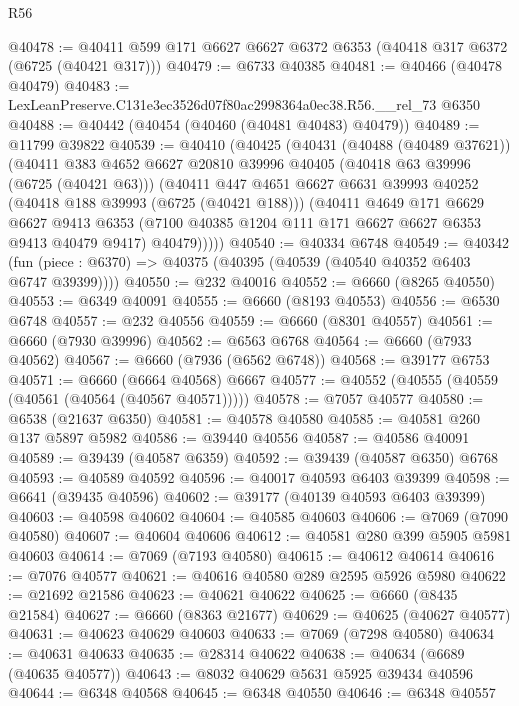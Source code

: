 \begin{lexlean}{R56}
\begin{coremodule}
@40478 := @40411 @599 @171 @6627 @6627 @6372 @6353 (@40418 @317 @6372 (@6725 (@40421 @317)))
@40479 := @6733 @40385
@40481 := @40466 (@40478 @40479)
@40483 := LexLeanPreserve.C131e3ec3526d07f80ac2998364a0ec38.R56.__rel_73 @6350
@40488 := @40442 (@40454 (@40460 (@40481 @40483) @40479))
@40489 := @11799 @39822
@40539 := @40410
    (@40425
      (@40431
        (@40488 (@40489 @37621))
        (@40411
          @383
          @4652
          @6627
          @20810
          @39996
          @40405
          (@40418 @63 @39996 (@6725 (@40421 @63)))
          (@40411
            @447
            @4651
            @6627
            @6631
            @39993
            @40252
            (@40418 @188 @39993 (@6725 (@40421 @188)))
            (@40411
              @4649
              @171
              @6629
              @6627
              @9413
              @6353
              (@7100 @40385 @1204 @111 @171 @6627 @6627 @6353 @9413 @40479 @9417)
              @40479)))))
@40540 := @40334 @6748
@40549 := @40342
    (fun (piece : @6370) => @40375 (@40395 (@40539 (@40540 @40352 @6403 @6747 @39399))))
@40550 := @232 @40016
@40552 := @6660 (@8265 @40550)
@40553 := @6349 @40091
@40555 := @6660 (@8193 @40553)
@40556 := @6530 @6748
@40557 := @232 @40556
@40559 := @6660 (@8301 @40557)
@40561 := @6660 (@7930 @39996)
@40562 := @6563 @6768
@40564 := @6660 (@7933 @40562)
@40567 := @6660 (@7936 (@6562 @6748))
@40568 := @39177 @6753
@40571 := @6660 (@6664 @40568) @6667
@40577 := @40552 (@40555 (@40559 (@40561 (@40564 (@40567 @40571)))))
@40578 := @7057 @40577
@40580 := @6538 (@21637 @6350)
@40581 := @40578 @40580
@40585 := @40581 @260 @137 @5897 @5982
@40586 := @39440 @40556
@40587 := @40586 @40091
@40589 := @39439 (@40587 @6359)
@40592 := @39439 (@40587 @6350) @6768
@40593 := @40589 @40592
@40596 := @40017 @40593 @6403 @39399
@40598 := @6641 (@39435 @40596)
@40602 := @39177 (@40139 @40593 @6403 @39399)
@40603 := @40598 @40602
@40604 := @40585 @40603
@40606 := @7069 (@7090 @40580)
@40607 := @40604 @40606
@40612 := @40581 @280 @399 @5905 @5981 @40603
@40614 := @7069 (@7193 @40580)
@40615 := @40612 @40614
@40616 := @7076 @40577
@40621 := @40616 @40580 @289 @2595 @5926 @5980
@40622 := @21692 @21586
@40623 := @40621 @40622
@40625 := @6660 (@8435 @21584)
@40627 := @6660 (@8363 @21677)
@40629 := @40625 (@40627 @40577)
@40631 := @40623 @40629 @40603
@40633 := @7069 (@7298 @40580)
@40634 := @40631 @40633
@40635 := @28314 @40622
@40638 := @40634 (@6689 (@40635 @40577))
@40643 := @8032 @40629 @5631 @5925 @39434 @40596
@40644 := @6348 @40568
@40645 := @6348 @40550
@40646 := @6348 @40557

\end{coremodule}
\end{lexlean}
